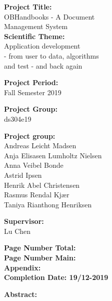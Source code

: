 \begin{minipage}[t]{0.48\textwidth}
\textbf{Project Title:} \\[5pt]\hspace*{2ex}
OBHandbooks - A Document\\ Management System\\


\textbf{Scientific Theme:} \\[5pt]\hspace{2ex}
Application development\\ - from user to data, algorithms\\ and test - and back again

\textbf{Project Period:} \\[5pt]\bigskip\hspace{2ex}
Fall Semester 2019

\textbf{Project Group:} \\[5pt]\bigskip\hspace{2ex}
ds304e19

\textbf{Project group:} \\[5pt]\hspace*{2ex}
Andreas Leicht Madsen \\\hspace*{2ex}
Anja Elisasen Lumholtz Nielsen \\\hspace*{2ex}
Anna Veibel Bonde \\\hspace*{2ex}
Astrid Ipsen \\\hspace*{2ex}
Henrik Abel Christensen \\\hspace*{2ex}
Rasmus Rendal Kjær \\\hspace*{2ex}
Taniya Rianthong Henriksen \\\hspace*{2ex}

\textbf{Supervisor:} \\[5pt]\hspace*{2ex}
Lu Chen \\\hspace*{2ex}

\vspace*{1cm}

\textbf{Page Number Total: \color{red}{???}}\\
\textbf{Page Number Main: \pageref{LastPage} }\\
\textbf{Appendix: \color{red}{???}} \\ 
\textbf{Completion Date: 19/12-2019}

\end{minipage}
\hfill
\begin{minipage}[t]{0.483\textwidth}
\textbf{Abstract:} \\[5pt]
\fbox{\parbox{8cm}{\bigskip\bigskip}}
\end{minipage}

